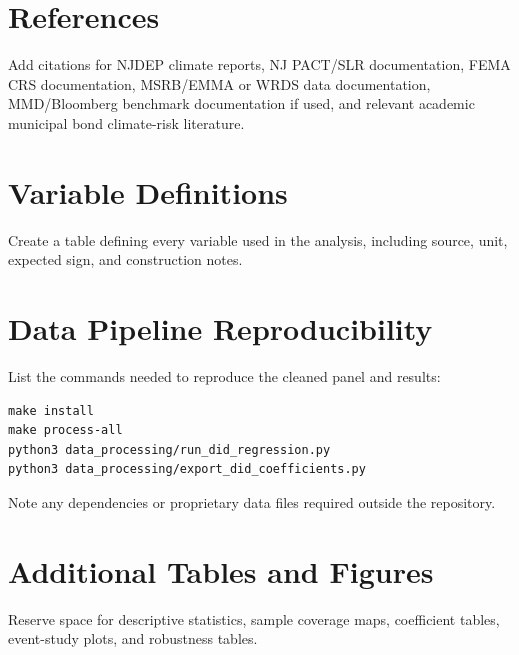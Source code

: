 \documentclass[12pt]{article}
\begin{document}
\section*{References}
Add citations for NJDEP climate reports, NJ PACT/SLR documentation, FEMA CRS documentation, MSRB/EMMA or WRDS data documentation, MMD/Bloomberg benchmark documentation if used, and relevant academic municipal bond climate-risk literature.

\appendix

\section{Variable Definitions}
Create a table defining every variable used in the analysis, including source, unit, expected sign, and construction notes.

\section{Data Pipeline Reproducibility}
List the commands needed to reproduce the cleaned panel and results:
\begin{verbatim}
make install
make process-all
python3 data_processing/run_did_regression.py
python3 data_processing/export_did_coefficients.py
\end{verbatim}
Note any dependencies or proprietary data files required outside the repository.

\section{Additional Tables and Figures}
Reserve space for descriptive statistics, sample coverage maps, coefficient tables, event-study plots, and robustness tables.
\end{document}
